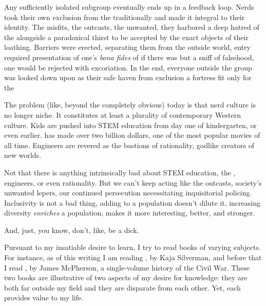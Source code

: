 \documentclass[../butidigress.tex]{subfiles}
\begin{document}
Any sufficiently isolated subgroup eventually ends up in a feedback loop.
Nerds took their own exclusion from the traditionally  and made it integral to their identity.
The misfits, the outcasts, the unwanted, they harbored a deep hatred of the  alongside a paradoxical thirst to be accepted by the exact objects of their loathing.
Barriers were erected, separating them from the outside world, entry required presentation of one's \textit{bona fides} of  if there was but a sniff of falsehood, one would be rejected with excoriation.
In the end, everyone outside the group was looked down upon as  their safe haven from exclusion a fortress fit only for the 

The problem (like, beyond the completely obvious) today is that nerd culture is no longer niche.
It constitutes at least a plurality of contemporary Western culture.
Kids are pushed into STEM education from day one of kindergarten, or even earlier.
 has made over two billion dollars, one of the most popular movies of all time.
Engineers are revered as the bastions of rationality, godlike creators of new worlds.

Not that there is anything intrinsically bad about STEM education, the , engineers, or even rationality.
But we can't keep acting like the outcasts, society's unwanted lepers, our continued persecution necessitating inquisitorial policing.
Inclusivity is not a bad thing, adding to a population doesn't dilute it, increasing diversity \emph{enriches} a population, makes it more interesting, better, and stronger.

And, just, you know, don't, like, be a dick.


Pursuant to my insatiable desire to learn, I try to read books of varying subjects.
For instance, as of this writing I am reading , by Kaja Silverman, and before that I read , by James McPherson, a single-volume history of the Civil War.
These two books are illustrative of two aspects of my desire for knowledge: they are both far outside my field and they are disparate from each other.
Yet, each provides value to my life.
\end{document}
